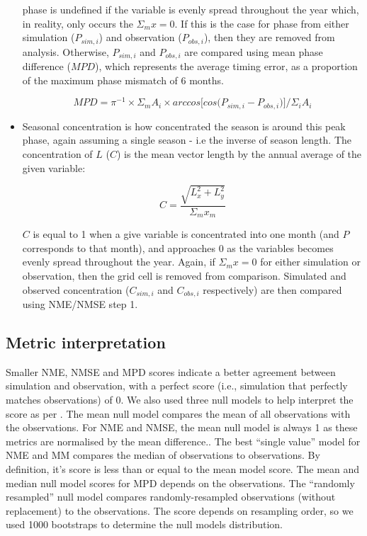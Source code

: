 \documentclass[bg, manuscript]{copernicus}
\begin{document}
\begin{itemize}
phase is undefined if the variable  is evenly spread throughout the year which, in reality, only occurs the $\Sigma_m x = 0$. If this is the case for phase from either simulation ($P_{sim, i}$) and observation ($P_{obs, i}$), then they are removed from analysis. Otherwise, $P_{sim, i}$ and $P_{obs, i}$ are compared using mean phase difference ($MPD$), which represents the average timing error, as a proportion of the maximum phase mismatch of 6 months.

\begin{equation}
    MPD = \pi^{-1} \times \Sigma_m A_i \times arccos \big[ cos \big(P_{sim, i} - P_{obs, i} \big) \big] / \Sigma_i A_i 
\end{equation}

    \item Seasonal concentration is how concentrated the season is around this peak phase, again assuming a single season - i.e the inverse of season length. The concentration of $L$ ($C$) is the mean vector length by the annual average of the given variable:

\begin{equation}
    C = \frac{\sqrt{L_x^2 + L_y^2}}{\Sigma_m x_m}
\end{equation}

$C$ is equal to 1 when a give variable is concentrated into one month (and $P$ corresponds to that month), and approaches 0 as the variables becomes evenly spread throughout the year. Again, if $\Sigma_m x = 0$ for either simulation or observation, then the grid cell is removed from comparison. Simulated and observed concentration ($C_{sim, i}$ and $C_{obs, i}$ respectively) are then compared using NME/NMSE step 1.

\end{itemize}

\subsection{Metric interpretation}
Smaller NME, NMSE and MPD scores indicate a better agreement between simulation and observation, with a perfect score (i.e., simulation that perfectly matches observations) of 0. We also used three null models to help interpret the score as per \citet{Burton2019-by, Kelley2019-yu}. The mean null model compares the mean of all observations with the observations. For NME and NMSE, the mean null model is always 1 as these metrics are normalised by the mean difference.. The best “single value” model for NME and MM compares the median of observations to observations. By definition, it’s score is less than or equal to the mean model score. The mean and median null model scores for MPD depends on the observations. The “randomly resampled” null model compares randomly-resampled observations (without replacement) to the observations. The score depends on resampling order, so we used 1000 bootstraps to determine the null models distribution. 
\end{document}
